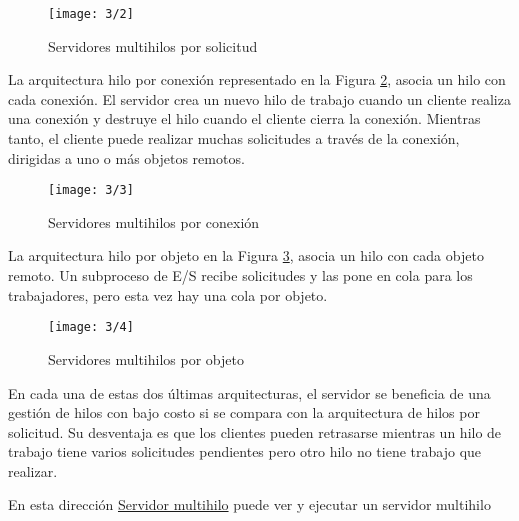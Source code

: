  		  \begin{figure}   
 		  	 \begin{center} %
 			\texttt{[image: 3/2]}  		 	 	 
 			\caption{Servidores multihilos por solicitud}
 			\label{fig:hilo-sol-1}
		  \end{center}
	   \end{figure} 
 
 
 La arquitectura hilo por conexión representado en la Figura \ref{fig:hilo-sol-2}, asocia un hilo con cada conexión. El servidor crea un nuevo hilo de trabajo cuando un cliente realiza una  conexión y destruye el hilo cuando el cliente cierra la conexión. Mientras tanto, el cliente puede realizar muchas solicitudes a través de la conexión, dirigidas a uno o más objetos remotos. 

  \begin{figure}   
  	 \begin{center}%
 	\texttt{[image: 3/3]} 	 
	\caption{Servidores multihilos por conexi\'on}
	\label{fig:hilo-sol-2}
 \end{center}
 \end{figure} 
 
  La arquitectura hilo por objeto en la Figura \ref{fig:hilo-sol-3}, asocia un hilo con cada  objeto remoto. Un subproceso de E/S recibe solicitudes y las pone en cola para los trabajadores, pero esta vez hay una cola por objeto.
   
     \begin{figure} 
     	   \begin{center} %
   	\texttt{[image: 3/4]} 	 
   	\caption{Servidores multihilos por objeto}
   	\label{fig:hilo-sol-3}
    \end{center}
 \end{figure} 
 
En cada una de estas dos últimas arquitecturas, el servidor se beneficia de una gestión de hilos con bajo costo si se compara con la arquitectura de hilos por solicitud. Su desventaja es que los clientes pueden retrasarse mientras un hilo de trabajo tiene varios solicitudes pendientes pero otro hilo no tiene trabajo que realizar.
 

\begin{tcolorbox}
	[colback=green!5!white,colframe=green!75!black,fonttitle=\bfseries,title= Ejemplo de servidor multihilo]
	En esta dirección \href{https://www.tutorialspoint.com/javaexamples/net_multisoc.htm}{Servidor multihilo} puede ver y ejecutar un servidor multihilo
\end{tcolorbox}

